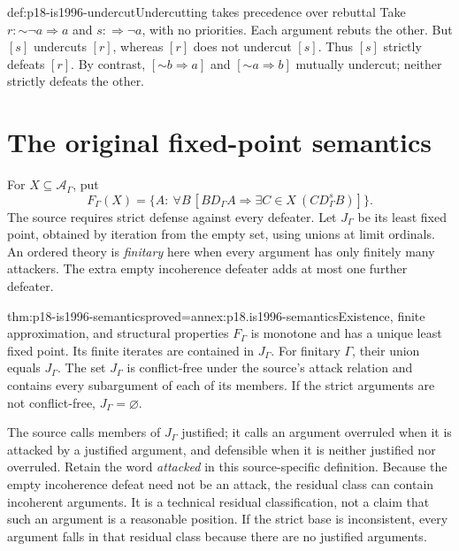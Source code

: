 \begin{hbexample}{def:p18-is1996-undercut}{Undercutting takes precedence over rebuttal}
Take \(r:\mathord{\sim}\neg a\Rightarrow a\) and
\(s:\Rightarrow\neg a\), with no priorities.
Each argument rebuts the other. But \([s]\) undercuts \([r]\),
whereas \([r]\) does not undercut \([s]\).
Thus \([s]\) strictly defeats \([r]\).
By contrast, \([\mathord{\sim}b\Rightarrow a]\) and
\([\mathord{\sim}a\Rightarrow b]\) mutually undercut;
neither strictly defeats the other.
\end{hbexample}

\section{The original fixed-point semantics}
\label{sec:p18-is1996-semantics}

For \(X\subseteq\mathcal A_\Gamma\), put
\[
F_\Gamma(X)=\{A:\ \forall B\,
 [B D_\Gamma A\Rightarrow
       \exists C\in X\ (C D_\Gamma^s B)]\}.
\]
The source requires strict defense against every defeater.
Let \(J_\Gamma\) be its least fixed point, obtained by iteration
from the empty set, using unions at limit ordinals.
An ordered theory is \emph{finitary} here when every argument
has only finitely many attackers. The extra empty incoherence
defeater adds at most one further defeater.

\begin{hbtheorem}{thm:p18-is1996-semantics}{proved=annex:p18.is1996-semantics}{Existence, finite approximation, and structural properties}
\(F_\Gamma\) is monotone and has a unique least fixed point.
Its finite iterates are contained in \(J_\Gamma\).
For finitary \(\Gamma\), their union equals \(J_\Gamma\).
The set \(J_\Gamma\) is conflict-free under the source's attack
relation and contains every subargument of each of its members.
If the strict arguments are not conflict-free, \(J_\Gamma=\varnothing\).
\end{hbtheorem}

The source calls members of \(J_\Gamma\) justified; it calls an
argument overruled when it is attacked by a justified argument,
and defensible when it is neither justified nor overruled.
Retain the word \emph{attacked} in this source-specific definition.
Because the empty incoherence defeat need not be an attack,
the residual class can contain incoherent arguments.
It is a technical residual classification, not a claim that
such an argument is a reasonable position.
If the strict base is inconsistent, every argument falls in
that residual class because there are no justified arguments.


